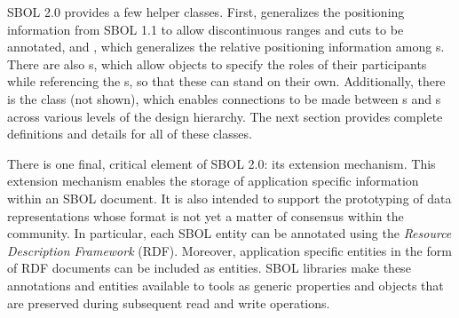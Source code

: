 SBOL 2.0 provides a few helper classes.  First,   generalizes the positioning information from SBOL 1.1 to allow discontinuous ranges and cuts to be annotated, and , which generalizes the relative positioning information among s.  
There are also s, which allow  objects to specify the roles of their participants while referencing the s, so that these can stand on their own.
Additionally, there is the  class (not shown), which enables connections to be made between s and s across various levels of the design hierarchy.  The next section provides complete definitions and details for all of these classes.

There is one final, critical element of SBOL 2.0: its extension mechanism. This extension mechanism enables the storage of application specific information within an SBOL document. It is also intended to support the prototyping of data representations whose format is not yet a matter of consensus within the community. In particular, each SBOL entity can be annotated using the \emph{Resource Description Framework} (RDF). Moreover, application specific entities in the form of RDF documents can be included as  entities. SBOL libraries make these annotations and entities available to tools as generic properties and objects that are preserved during subsequent read and write operations.

